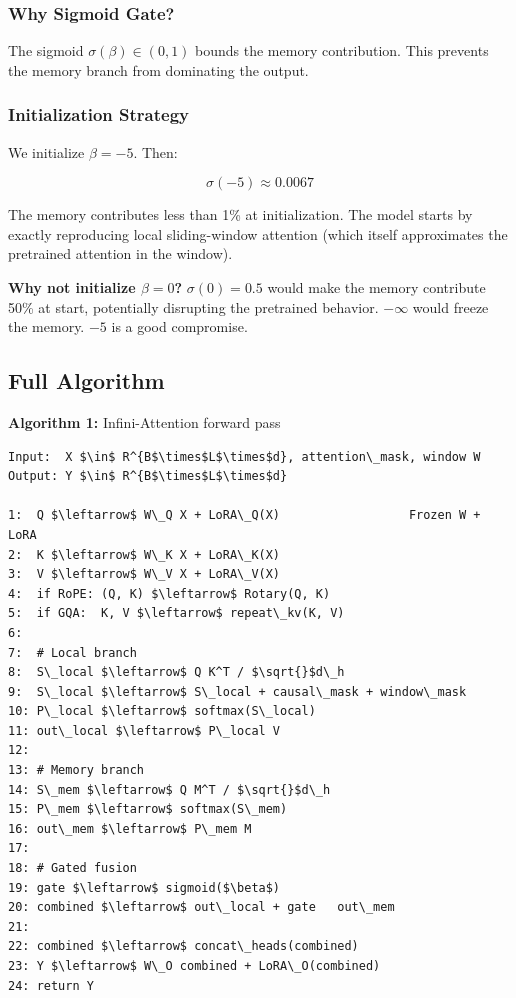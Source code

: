 \subsubsection{Why Sigmoid Gate?}

The sigmoid $\sigma(\beta) \in (0, 1)$ bounds the memory contribution. This 
prevents the memory branch from dominating the output.

\subsubsection{Initialization Strategy}

We initialize $\beta = -5$. Then:

\[
\sigma(-5) \approx 0.0067
\tag{4.8}
\]

The memory contributes less than 1\% at initialization. The model starts 
by exactly reproducing local sliding-window attention (which itself 
approximates the pretrained attention in the window).

\textbf{Why not initialize $\beta = 0$?} $\sigma(0) = 0.5$ would make the memory 
contribute 50\% at start, potentially disrupting the pretrained behavior. 
$-\infty$ would freeze the memory. $-5$ is a good compromise.

\subsection{Full Algorithm}

\textbf{Algorithm 1:} Infini-Attention forward pass
\begin{lstlisting}
Input:  X $\in$ R^{B$\times$L$\times$d}, attention\_mask, window W
Output: Y $\in$ R^{B$\times$L$\times$d}

1:  Q $\leftarrow$ W\_Q X + LoRA\_Q(X)                  Frozen W + LoRA
2:  K $\leftarrow$ W\_K X + LoRA\_K(X)
3:  V $\leftarrow$ W\_V X + LoRA\_V(X)
4:  if RoPE: (Q, K) $\leftarrow$ Rotary(Q, K)
5:  if GQA:  K, V $\leftarrow$ repeat\_kv(K, V)
6:
7:  # Local branch
8:  S\_local $\leftarrow$ Q K^T / $\sqrt{}$d\_h
9:  S\_local $\leftarrow$ S\_local + causal\_mask + window\_mask
10: P\_local $\leftarrow$ softmax(S\_local)
11: out\_local $\leftarrow$ P\_local V
12:
13: # Memory branch
14: S\_mem $\leftarrow$ Q M^T / $\sqrt{}$d\_h
15: P\_mem $\leftarrow$ softmax(S\_mem)
16: out\_mem $\leftarrow$ P\_mem M
17:
18: # Gated fusion
19: gate $\leftarrow$ sigmoid($\beta$)
20: combined $\leftarrow$ out\_local + gate   out\_mem
21:
22: combined $\leftarrow$ concat\_heads(combined)
23: Y $\leftarrow$ W\_O combined + LoRA\_O(combined)
24: return Y
\end{lstlisting}

